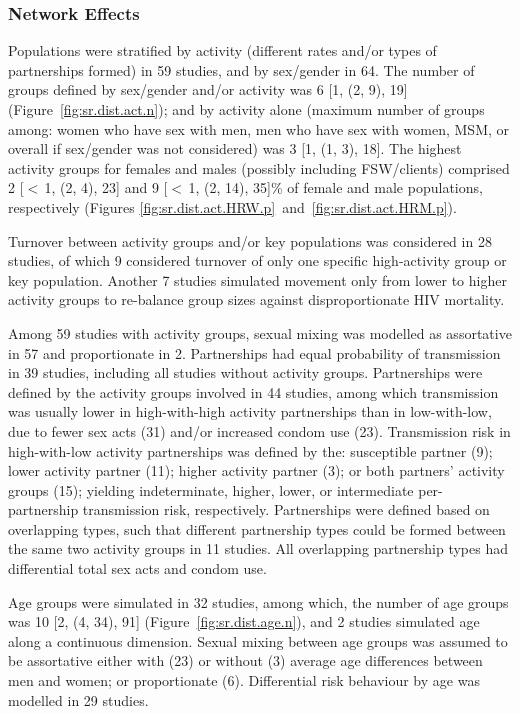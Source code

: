 \subsubsection{Network Effects}\label{sr.res.f.net}
Populations were stratified by activity (different rates and/or types of partnerships formed)
in 59 studies, and by sex/gender in 64.
The number of groups defined by sex/gender and/or activity was 6 [1, (2, 9), 19] (Figure~\ref{fig:sr.dist.act.n});
and by activity alone (maximum number of groups among:
women who have sex with men, men who have sex with women,
MSM, or overall if sex/gender was not considered) was 3 [1, (1, 3), 18].
The highest activity groups for females and males (possibly including FSW/clients) comprised
2 [$<$\,1, (2, 4), 23] and 9 [$<$\,1, (2, 14), 35]\% of female and male populations, respectively
(Figures \ref{fig:sr.dist.act.HRW.p}~and~\ref{fig:sr.dist.act.HRM.p}).
\par
Turnover between activity groups and/or key populations was considered in 28 studies,
of which 9 considered turnover of only one specific high-activity group or key population.
Another 7 studies simulated movement only from lower to higher activity groups
to re-balance group sizes against disproportionate HIV mortality.
\par
Among 59 studies with activity groups, sexual mixing was modelled as
assortative in 57 and proportionate in 2.
Partnerships had equal probability of transmission in 39 studies,
including all studies without activity groups.
Partnerships were defined by the activity groups involved in 44 studies,
among which transmission was usually
lower in high-with-high activity partnerships than in low-with-low, due to
fewer sex acts (31) and/or increased condom use (23).
Transmission risk in high-with-low activity partnerships was defined by the:
susceptible partner (9);
lower activity partner (11);
higher activity partner (3); or
both partners' activity groups (15); yielding
indeterminate, higher, lower, or intermediate per-partnership transmission risk, respectively.
Partnerships were defined based on overlapping types, such that
different partnership types could be formed between the same two activity groups in 11 studies.
All overlapping partnership types had differential total sex acts and condom use.
\par
Age groups were simulated in 32 studies, among which,
the number of age groups was 10 [2, (4, 34), 91] (Figure~\ref{fig:sr.dist.age.n}),
and 2 studies simulated age along a continuous dimension.
Sexual mixing between age groups was assumed to be assortative
either with (23) or without (3) average age differences between men and women;
or proportionate (6).
Differential risk behaviour by age was modelled in 29 studies.
